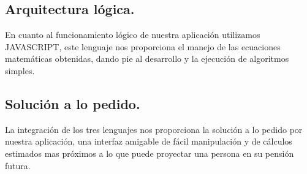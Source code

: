 \documentclass{udpreport}
\begin{document}
\subsection{Arquitectura lógica.}
En cuanto al funcionamiento lógico de nuestra aplicación utilizamos JAVASCRIPT, este lenguaje nos proporciona el manejo  de las ecuaciones matemáticas obtenidas, dando pie al desarrollo y  la ejecución de algoritmos simples. 
\subsection{Solución a lo pedido.}
La integración de los tres lenguajes nos proporciona la solución a lo pedido por nuestra aplicación,  una interfaz amigable de fácil manipulación y de cálculos estimados mas próximos a lo que puede proyectar una persona en su pensión futura.
\end{document}
